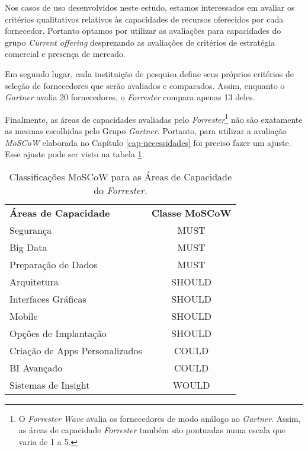 Nos casos de uso desenvolvidos neste estudo, estamos interessados em avaliar os critérios qualitativos relativos às capacidades de recursos oferecidos por cada fornecedor. Portanto optamos por utilizar as avaliações para capacidades do grupo \emph{Current offering} desprezando as avaliações de critérios de estratégia comercial e presença de mercado.  

Em segundo lugar, cada instituição de pesquisa define seus próprios critérios de seleção de fornecedores que serão avaliados e comparados. Assim, enquanto o \emph{Gartner} avalia 20 fornecedores, o \emph{Forrester} compara apenas 13 deles.

Finalmente, as áreas de capacidades avaliadas pelo \emph{Forrester}\footnote{O \emph{Forrester Wave} avalia os fornecedores de modo análogo ao \emph{Gartner}. Assim, as áreas de capacidade \emph{Forrester} também são pontuadas numa escala que varia de 1 a 5.} não são exatamente as mesmas escolhidas pelo Grupo \emph{Gartner}. Portanto, para utilizar a avaliação \emph{MoSCoW} elaborada no Capítulo \ref{cap-necessidades} foi preciso fazer um ajuste. Esse ajuste pode ser visto na tabela \ref{tab:moscowordered-fw}. 



\begin{table}[!h]
    \begin{center}
    \begin{tabular}{|p{}|c|}
        \hline
            \rowcolor{cldfB1} \multicolumn{2}{|c|}{\Large Classes MoSCoW \emph{Forrester} \normalsize} \\ \hline \hline
            \rowcolor{lightgray}\textbf{Áreas de Capacidade} & \textbf{Classe MoSCoW} \\ \hline
            \rowcolor{corMUST!80}Segurança & MUST \\ \hline
            \rowcolor{corMUST!80}Big Data & MUST \\ \hline
            \rowcolor{corMUST!80}Preparação de Dados & MUST \\ \hline
            \rowcolor{corSHOULD!80}Arquitetura & SHOULD \\ \hline
            \rowcolor{corSHOULD!80}Interfaces Gráficas & SHOULD \\ \hline
            \rowcolor{corSHOULD!80}Mobile & SHOULD \\ \hline
            \rowcolor{corSHOULD!80}Opções de Implantação & SHOULD \\ \hline
            \rowcolor{corCOULD!50}Criação de Apps Personalizados & COULD \\ \hline
            \rowcolor{corCOULD!50}BI Avançado & COULD \\ \hline
            \rowcolor{corWOULD!50}Sistemas de Insight & WOULD \\ \hline
    \end{tabular}    
    \caption{\label{tab:moscowordered-fw} Classificações MoSCoW para as Áreas de Capacidade do \emph{Forrester}.}
    \end{center}
\end{table}


